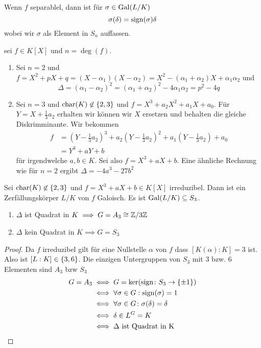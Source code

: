 \begin{Bem}
	Wenn \(f\) separablel, dann ist für \(\sigma\in\operatorname{Gal}(L/K)\) \[\sigma(\delta)=\operatorname{sign}(\sigma)\delta\] wobei wir \(\sigma\) als Element in \(S_n\) auffassen.
\end{Bem}
\begin{Bem}
	sei \(f\in K[X]\) und \(n=\deg(f)\).
	\begin{enumerate}
		\item Sei \(n=2\) und \(f=X^2+pX+q=(X-\alpha_1)(X-\alpha_2)=X^2-(\alpha_1+\alpha_2)X+\alpha_1\alpha_2\)
		und \[\Delta=(\alpha_1-\alpha_2)^2=(\alpha_1+\alpha_2)^2-4\alpha_1\alpha_2=p^2-4q\]
		\item Sei \(n=3\) und \(\operatorname{char} (K)\not\in\{2,3\}\) und \(f=X^3+a_2X^2+a_1X+a_0\). Für \(Y=X+\frac{1}{3}a_2\) erhalten wir können wir \(X\) ersetzen und behalten die gleiche Diskrimminante. Wir bekommen
		\begin{align*}
			f&=(Y-\frac{1}{3}a_2)^3+a_2(Y-\frac 13 a_2)^2+a_1(Y-\frac 1 3a_2)+a_0\\
			&=Y^3+aY+b
		\end{align*} für irgendwelche \(a,b\in K\). Sei also \(f=X^3+aX+b\). Eine ähnliche 
		Rechnung wie für \(n=2\) ergibt \(\Delta=-4a^3-27b^2\)
	\end{enumerate}
\end{Bem}
\begin{Satz}
	Sei \(\operatorname{char} (K)\not\in\{2,3\}\) und \(f=X^3+aX+b\in K[X]\) irreduzibel. Dann ist ein Zerfällungskörper \(L/K\) von \(f\) Galoisch. Es ist \(\operatorname{Gal}(L/K)\subseteq S_3\).
	\begin{enumerate}
		\item \(\Delta\) ist Quadrat in \(K\implies G=A_3\cong\mathbb{Z}/3\mathbb{Z}\)
		\item \(\Delta\) kein Quadrat in \(K\implies G=S_3\)
	\end{enumerate}
\end{Satz}
\begin{proof}
	Da \(f\) irreduzibel gilt für eine Nullstelle \(\alpha\) von \(f\) dass \([K(\alpha):K]=3\) ist. Also ist \([L:K]\in\{3,6\}\).
	Die einzigen Untergruppen von \(S_3\) mit 3 bzw. 6 Elementen sind \(A_3\) bzw \(S_3\)
	\begin{align*}
		G=A_3&\iff G=\ker(\operatorname{sign}\colon S_3\to\{\pm 1\})\\
		&\iff \forall\sigma\in G: \operatorname{sign}(\sigma)=1\\
		&\iff \forall \sigma\in G\colon \sigma(\delta)=\delta\\
		&\iff \delta\in L^G=K\\
		&\iff \Delta \text{ ist Quadrat in K}
	\end{align*}
\end{proof}
